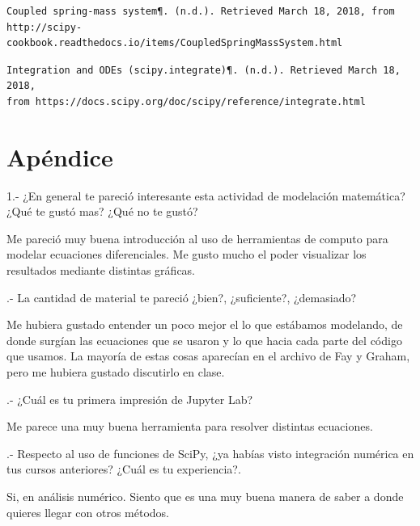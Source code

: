 \documentclass{article}
\begin{document}
\begin{verbatim}
Coupled spring-mass system¶. (n.d.). Retrieved March 18, 2018, from
http://scipy-cookbook.readthedocs.io/items/CoupledSpringMassSystem.html 
\end{verbatim}

\begin{verbatim}
Integration and ODEs (scipy.integrate)¶. (n.d.). Retrieved March 18, 2018,
from https://docs.scipy.org/doc/scipy/reference/integrate.html 
\end{verbatim}

\section{Apéndice}


    1.- ¿En general te pareció interesante esta actividad de modelación matemática? ¿Qué te gustó mas? ¿Qué no te gustó?
    
    \vspace{0.3cm}
Me pareció muy buena introducción al uso de herramientas de computo para modelar ecuaciones diferenciales. Me gusto mucho el poder visualizar los resultados mediante distintas gráficas. 
    \vspace{0.3cm}
    
.- La cantidad de material te pareció ¿bien?, ¿suficiente?, ¿demasiado?
    
    \vspace{0.3cm}
Me hubiera gustado entender un poco mejor el lo que estábamos modelando, de donde surgían las ecuaciones que se usaron y lo que hacia cada parte del código que usamos. La mayoría de estas cosas aparecían en el archivo de Fay y Graham, pero me hubiera gustado discutirlo en clase.
    \vspace{0.3cm}
    
.- ¿Cuál es tu primera impresión de Jupyter Lab? 

	\vspace{0.3cm}
Me parece una muy buena herramienta para resolver distintas ecuaciones.
    \vspace{0.3cm}

.- Respecto al uso de funciones de SciPy, ¿ya habías visto integración numérica en tus cursos anteriores? ¿Cuál es tu experiencia?.

	\vspace{0.3cm}
Si, en análisis numérico. Siento que es una muy buena manera de saber a donde quieres llegar con otros métodos.
    \vspace{0.3cm}
\end{document}
